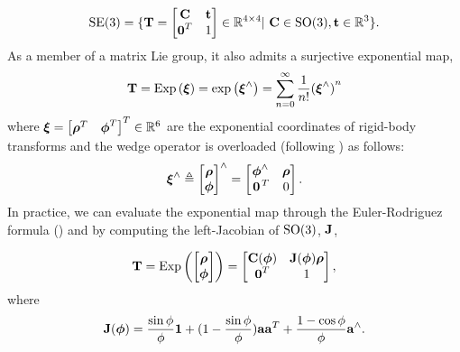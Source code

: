 \begin{equation}
\mathrm{SE}(3) = \{ \boldsymbol{\mathbf{T}} = \begin{bmatrix} \boldsymbol{\mathbf{C}} & \boldsymbol{\mathbf{t}} \\ \boldsymbol{\mathbf{0}}^T & 1 \end{bmatrix} \in \mathbb{R}{}^{4 \times 4} | ~  \boldsymbol{\mathbf{C}} \in \mathrm{SO}(3),  \boldsymbol{\mathbf{t}} \in \mathbb{R}{}^3  \}.
\end{equation}
As a member of a matrix Lie group, it also admits a surjective exponential map,
\begin{equation}
\boldsymbol{\mathbf{T}} = \mathrm{Exp}\left({\boldsymbol{\mathbf{\xi}}}\right) = \mathrm{exp}\left({\boldsymbol{\mathbf{\xi}}}^{\wedge}\right) = \sum_{n=0}^{\infty}  \frac{1}{n!} {(\boldsymbol{\mathbf{\xi}}^\wedge)}^n	
\end{equation}
where $\boldsymbol{\mathbf{\xi}} = \begin{bmatrix} \boldsymbol{\mathbf{\rho}}^T & \boldsymbol{\mathbf{\phi}}^T \end{bmatrix}^T \in \mathbb{R}{}^6$ are the exponential coordinates of rigid-body transforms and the wedge operator is overloaded (following \cite{Barfoot2017-ri}) as follows:
\begin{equation}
  \boldsymbol{\mathbf{\xi}}^\wedge \triangleq \begin{bmatrix} \boldsymbol{\mathbf{\rho}} \\ \boldsymbol{\mathbf{\phi}} \end{bmatrix} ^\wedge = \begin{bmatrix}
  \boldsymbol{\mathbf{\phi}}^\wedge & \boldsymbol{\mathbf{\rho}} \\ \left.{\boldsymbol{\mathbf{0}}}\right.^T &  0 \end{bmatrix}.	
\end{equation}
In practice, we can evaluate the exponential map through the Euler-Rodriguez formula () and by computing the left-Jacobian of $\mathrm{SO}(3)$,  $\boldsymbol{\mathbf{J}}$, 

\begin{equation}
\boldsymbol{\mathbf{T}} = \mathrm{Exp}\left({\begin{bmatrix} \boldsymbol{\mathbf{\rho}} \\ \boldsymbol{\mathbf{\phi}} \end{bmatrix}}\right) = \begin{bmatrix} \boldsymbol{\mathbf{C}}(\boldsymbol{\mathbf{\phi}}) & \boldsymbol{\mathbf{J}}(\boldsymbol{\mathbf{\phi}}) \boldsymbol{\mathbf{\rho}} \\ \boldsymbol{\mathbf{0}}^T & 1 \end{bmatrix},
\end{equation}
where
\begin{equation}
\boldsymbol{\mathbf{J}}(\boldsymbol{\mathbf{\phi}}) = \frac{\sin{\phi}}{\phi} \boldsymbol{\mathbf{1}} + (1 - \frac{\sin{\phi}}{\phi}) \boldsymbol{\mathbf{a}}\boldsymbol{\mathbf{a}}^T + \frac{1 - \cos{\phi}}{\phi} \boldsymbol{\mathbf{a}}^\wedge.
\end{equation}




